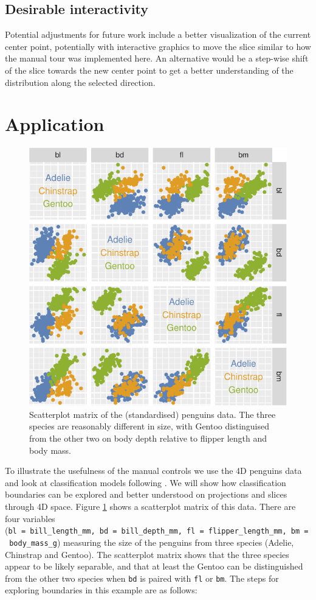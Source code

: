\documentclass[]{interact}
\theoremstyle{plain}%
\theoremstyle{definition}
\theoremstyle{remark}
\begin{document}
\hypertarget{desirable-interactivity}{%
\subsection{Desirable interactivity}\label{desirable-interactivity}}

Potential adjustments for future work include a better visualization of
the current center point, potentially with interactive graphics to move
the slice similar to how the manual tour was implemented here. An
alternative would be a step-wise shift of the slice towards the new
center point to get a better understanding of the distribution along the
selected direction.

\hypertarget{sec:examples}{%
\section{Application}\label{sec:examples}}

\begin{figure}

{\centering \includegraphics[width=0.6\linewidth]{paper_files/figure-latex/penguins-scatmat-1} 

}

\caption{Scatterplot matrix of the (standardised) penguins data. The three species are reasonably different in size, with Gentoo distinguised from the other two on body depth relative to flipper length and body mass.}\label{fig:penguins-scatmat}
\end{figure}

To illustrate the usefulness of the manual controls we use the 4D
penguins data \citep{penguins} and look at classification models
following \citet{sam11271}. We will show how classification boundaries
can be explored and better understood on projections and slices through
4D space. Figure \ref{fig:penguins-scatmat} shows a scatterplot matrix
of this data. There are four variables
(\texttt{bl\ =\ bill\_length\_mm,\ bd\ =\ bill\_depth\_mm,\ fl\ =\ flipper\_length\_mm,\ bm\ =\ body\_mass\_g})
measuring the size of the penguins from three species (Adelie, Chinstrap
and Gentoo). The scatterplot matrix shows that the three species appear
to be likely separable, and that at least the Gentoo can be
distinguished from the other two species when \texttt{bd} is paired with
\texttt{fl} or \texttt{bm}. The steps for exploring boundaries in this
example are as follows:
\end{document}
